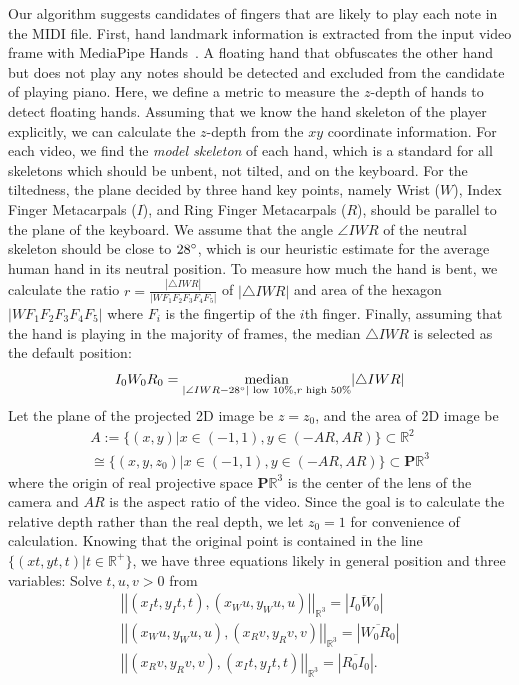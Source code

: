 \documentclass{article}
\begin{document}
Our algorithm suggests candidates of fingers that are likely to play each note in the MIDI file. First, hand landmark information is extracted from the input video frame with MediaPipe Hands~\cite{arXiv20Zhang}. A floating hand that obfuscates the other hand but does not play any notes should be detected and excluded from the candidate of playing piano. Here, we define a metric to measure the $z$-depth of hands to detect floating hands. Assuming that we know the hand skeleton of the player explicitly, we can calculate the $z$-depth from the $xy$ coordinate information. For each video, we find the \textit{model skeleton} of each hand, which is a standard for all skeletons which should be unbent, not tilted, and on the keyboard. For the tiltedness, the plane decided by three hand key points, namely Wrist ($W$), Index Finger Metacarpals ($I$), and Ring Finger Metacarpals ($R$), should be parallel to the plane of the keyboard. We assume that the angle $\angle IWR$ of the neutral skeleton should be close to $28\degree$, which is our heuristic estimate for the average human hand in its neutral position. To measure how much the hand is bent, we calculate the ratio $r=\frac{|\triangle IWR|}{|WF_{1}F_{2}F_{3}F_{4}F_{5}|}$ of $|\triangle IWR|$ and area of the hexagon $|WF_{1}F_{2}F_{3}F_{4}F_{5}|$ where $F_i$ is the fingertip of the $i$th finger. Finally, assuming that the hand is playing in the majority of frames, the median $\triangle IWR$ is selected as the default position:
\begin{equation}
    I_{0}W_{0}R_{0}=\underset{|\angle IWR - 28\degree| \text{ low 10\%}, r \text{ high 50\%}}{\text{median}}|\triangle IWR|
\end{equation}
Let the plane of the projected 2D image be $z=z_{0}$, and the area of 2D image be
\begin{equation}
  \begin{aligned}
    A:=\{(x,y)  | x\in (-1,1), y\in (-AR,AR)\} \subset \mathbb{R}^2
    \\\cong\{(x,y,z_{0})|x\in(-1,1), y\in (-AR,AR)\}\subset \mathbf{P}\mathbb{R}^3
\end{aligned}  
\end{equation}
where the origin of real projective space $\mathbf{P}\mathbb{R}^3$ is the center of the lens of the camera and $AR$ is the aspect ratio of the video. Since the goal is to calculate the relative depth rather than the real depth, we let $z_{0}=1$ for convenience of calculation.
Knowing that the original point is contained in the line $\{(xt,yt,t) | t\in \mathbb{R^{+}}\}$, we have three equations likely in general position and three variables: Solve $t,u,v>0$ from
\begin{gather}
    \left||(x_{I}t,y_{I}t,t),(x_{W}u,y_{W}u,u)|\right|_{\mathbb{R}^3}=\left|\overline{I_{0}W_{0}}\right| \\
    \left||(x_{W}u,y_{W}u,u),(x_{R}v,y_{R}v,v)|\right|_{\mathbb{R}^3}=\left|\overline{W_{0}R_{0}}\right| \\
    \left||(x_{R}v,y_{R}v,v),(x_{I}t,y_{I}t,t)|\right|_{\mathbb{R}^3}=\left|\overline{R_{0}I_{0}}\right|.
\end{gather}
\end{document}
